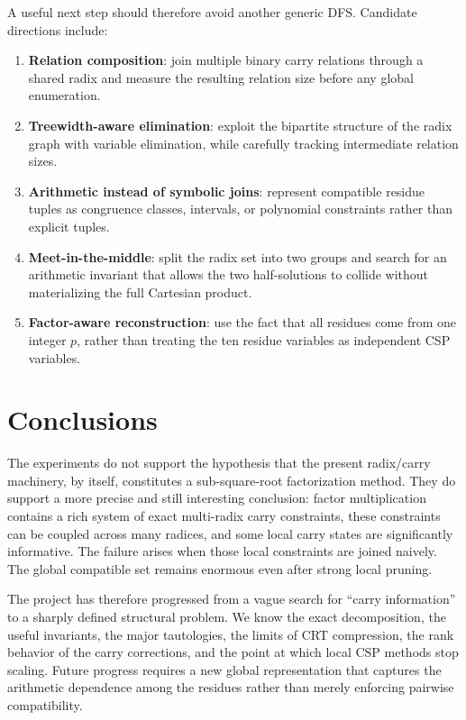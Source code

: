 \documentclass[11pt,a4paper]{article}
\begin{document}
A useful next step should therefore avoid another generic DFS. Candidate directions include:
\begin{enumerate}[label=(\arabic*)]
    \item \textbf{Relation composition}: join multiple binary carry relations through a shared radix and measure the resulting relation size before any global enumeration.
    \item \textbf{Treewidth-aware elimination}: exploit the bipartite structure of the radix graph with variable elimination, while carefully tracking intermediate relation sizes.
    \item \textbf{Arithmetic instead of symbolic joins}: represent compatible residue tuples as congruence classes, intervals, or polynomial constraints rather than explicit tuples.
    \item \textbf{Meet-in-the-middle}: split the radix set into two groups and search for an arithmetic invariant that allows the two half-solutions to collide without materializing the full Cartesian product.
    \item \textbf{Factor-aware reconstruction}: use the fact that all residues come from one integer \(p\), rather than treating the ten residue variables as independent CSP variables.
\end{enumerate}

\section{Conclusions}
The experiments do not support the hypothesis that the present radix/carry machinery, by itself, constitutes a sub-square-root factorization method. They do support a more precise and still interesting conclusion: factor multiplication contains a rich system of exact multi-radix carry constraints, these constraints can be coupled across many radices, and some local carry states are significantly informative. The failure arises when those local constraints are joined naively. The global compatible set remains enormous even after strong local pruning.

The project has therefore progressed from a vague search for ``carry information'' to a sharply defined structural problem. We know the exact decomposition, the useful invariants, the major tautologies, the limits of CRT compression, the rank behavior of the carry corrections, and the point at which local CSP methods stop scaling. Future progress requires a new global representation that captures the arithmetic dependence among the residues rather than merely enforcing pairwise compatibility.
\end{document}
